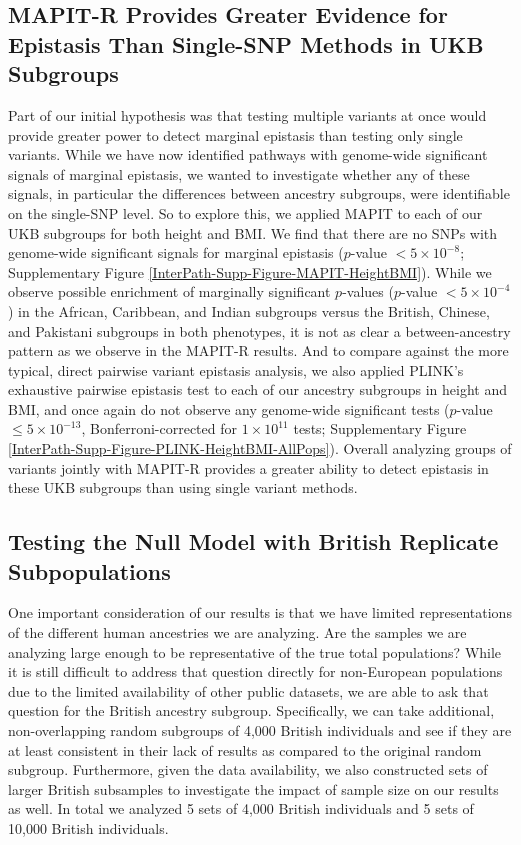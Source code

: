 \documentclass[12pt,a4paper]{article}
\begin{document}


\subsection{MAPIT-R Provides Greater Evidence for Epistasis Than Single-SNP Methods in UKB Subgroups}\label{InterPath-Results-SNPEpistasis}

Part of our initial hypothesis was that testing multiple variants at once would provide greater power to detect marginal epistasis than testing only single variants. While we have now identified pathways with genome-wide significant signals of marginal epistasis, we wanted to investigate whether any of these signals, in particular the differences between ancestry subgroups, were identifiable on the single-SNP level. So to explore this, we applied MAPIT to each of our UKB subgroups for both height and BMI. We find that there are no SNPs with genome-wide significant signals for marginal epistasis ($p$-value $< 5\times10^{-8}$; Supplementary Figure \ref{InterPath-Supp-Figure-MAPIT-HeightBMI}). While we observe possible enrichment of marginally significant $p$-values ($p$-value $< 5\times10^{-4}$) in the African, Caribbean, and Indian subgroups versus the British, Chinese, and Pakistani subgroups in both phenotypes, it is not as clear a between-ancestry pattern as we observe in the MAPIT-R results. And to compare against the more typical, direct pairwise variant epistasis analysis, we also applied PLINK's exhaustive pairwise epistasis test \citep{Purcell2007} to each of our ancestry subgroups in height and BMI, and once again do not observe any genome-wide significant tests ($p$-value $\leq 5\times10^{-13}$, Bonferroni-corrected for $1\times10^{11}$ tests; Supplementary Figure \ref{InterPath-Supp-Figure-PLINK-HeightBMI-AllPops}). Overall analyzing groups of variants jointly with MAPIT-R provides a greater ability to detect epistasis in these UKB subgroups than using single variant methods. 

\subsection{Testing the Null Model with British Replicate Subpopulations}

One important consideration of our results is that we have limited representations of the different human ancestries we are analyzing. Are the samples we are analyzing large enough to be representative of the true total populations? While it is still difficult to address that question directly for non-European populations due to the limited availability of other public datasets, we are able to ask that question for the British ancestry subgroup. Specifically, we can take additional, non-overlapping random subgroups of 4,000 British individuals and see if they are at least consistent in their lack of results as compared to the original random subgroup. Furthermore, given the data availability, we also constructed sets of larger British subsamples to investigate the impact of sample size on our results as well. In total we analyzed 5 sets of 4,000 British individuals and 5 sets of 10,000 British individuals. 
\end{document}

